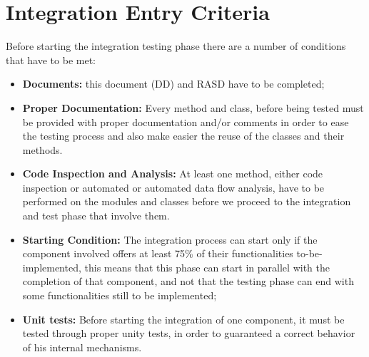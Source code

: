 \section{Integration Entry Criteria}
Before starting the integration testing phase there are a number of conditions that have to be met:
\begin{itemize}
\item \textbf{Documents:} this document (DD) and RASD have to be completed;
\item \textbf{Proper Documentation:} Every method and class, before being tested must be provided with proper documentation and/or comments in order to ease the testing process and also make easier the reuse of the classes and their methods.
\item \textbf{Code Inspection and Analysis:} At least one method, either code inspection or automated or automated data flow analysis, have to be performed on the modules and classes before we proceed to the integration and test phase that involve them.
\item \textbf{Starting Condition:} The integration process can start only if the component involved offers at least 75\% of their functionalities to-be-implemented, this means that this phase can start in parallel with the completion of that component, and not that the testing phase can end with some functionalities still to be implemented; 
\item \textbf{Unit tests:} Before starting the integration of one component, it must be tested through proper unity tests, in order to guaranteed a correct behavior of his internal mechanisms.
\end{itemize}
